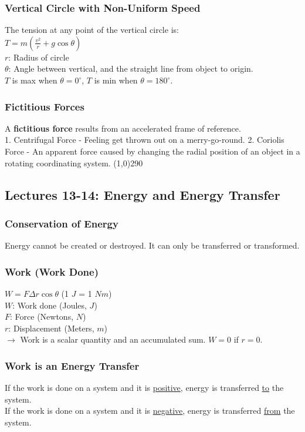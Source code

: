 \documentclass[10 pt]{article}
\begin{document}
\begin{multicols}{2}
\subsubsection*{Vertical Circle with Non-Uniform Speed}
\noindent The tension at any point of the vertical circle is:\\
\indent $T = m\left( \frac{v^2}{r} + g \cos{\theta} \right)$\\
$r$: Radius of circle\\
$\theta$: Angle between vertical, and the straight line from object to origin.\\
$T$ is max when $\theta=0^\circ$, $T$ is min when $\theta=180^\circ$.
\subsubsection*{Fictitious Forces}
\noindent A \textbf{fictitious force} results from an accelerated frame of reference.\\
1. Centrifugal Force - Feeling get thrown out on a merry-go-round.
2. Coriolis Force - An apparent force caused by changing the radial position of an object in a rotating coordinating system.
\line(1,0){290}
\subsection*{Lectures 13-14: Energy and Energy Transfer}
\subsubsection*{Conservation of Energy}
\noindent Energy cannot be created or destroyed. It can only be transferred or transformed.
\subsubsection*{Work (Work Done)}
$W = F \Delta r \cos{\theta}$ (1 $J$ = 1 $Nm$)\\
$W$: Work done (Joules, $J$)\\
$F$: Force (Newtons, $N$)\\
$r$: Displacement (Meters, $m$)\\
$\rightarrow$ Work is a scalar quantity and an accumulated sum. $W=0$ if $r=0$.
\subsubsection*{Work is an Energy Transfer}
\noindent If the work is done on a system and it is \underline{positive}, energy is transferred \underline{to} the system.\\
\noindent If the work is done on a system and it is \underline{negative}, energy is transferred \underline{from} the system.

\end{multicols}
\end{document}
